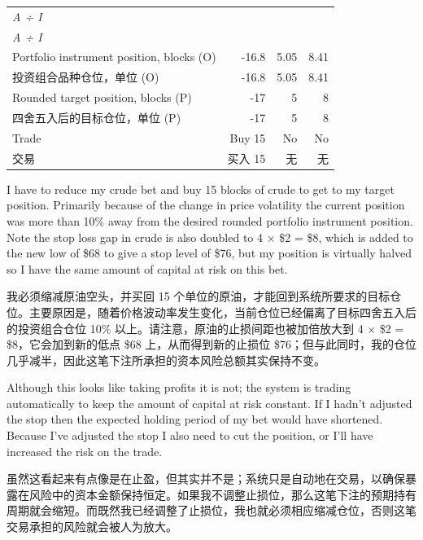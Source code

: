 \begin{bilingualtableblock}
{\begin{tabularx}{\textwidth}{@{} p{}*{3}{R}@{}}
\emph{A ÷ I} & & & \\
\emph{A ÷ I} & & & \\
Portfolio instrument position, blocks (O) & -16.8 & 5.05 & 8.41 \\
投资组合品种仓位，单位 (O) & -16.8 & 5.05 & 8.41 \\
Rounded target position, blocks (P) & -17 & 5 & 8 \\
四舍五入后的目标仓位，单位 (P) & -17 & 5 & 8 \\
Trade & Buy 15 & No & No \\
交易 & 买入 15 & 无 & 无 \\
\bottomrule
\end{tabularx}
}
\end{bilingualtableblock}

\begin{englishblock} I have to reduce my crude bet and buy 15 blocks of crude to get to my target position. Primarily because of the change in price volatility the current position was more than 10\% away from the desired rounded portfolio instrument position. Note the stop loss gap in crude is also doubled to 4 × \$2 = \$8, which is added to the new low of \$68 to give a stop level of \$76, but my position is virtually halved so I have the same amount of capital at risk on this bet. \end{englishblock}

\begin{chineseblock}我必须缩减原油空头，并买回 15 个单位的原油，才能回到系统所要求的目标仓位。主要原因是，随着价格波动率发生变化，当前仓位已经偏离了目标四舍五入后的投资组合仓位 10\% 以上。请注意，原油的止损间距也被加倍放大到 4 × \$2 = \$8，它会加到新的低点 \$68 上，从而得到新的止损位 \$76；但与此同时，我的仓位几乎减半，因此这笔下注所承担的资本风险总额其实保持不变。\end{chineseblock}

\bipairgap

\begin{englishblock} Although this looks like taking profits it is not; the system is trading automatically to keep the amount of capital at risk constant. If I hadn't adjusted the stop then the expected holding period of my bet would have shortened. Because I've adjusted the stop I also need to cut the position, or I'll have increased the risk on the trade. \end{englishblock}

\begin{chineseblock}虽然这看起来有点像是在止盈，但其实并不是；系统只是自动地在交易，以确保暴露在风险中的资本金额保持恒定。如果我不调整止损位，那么这笔下注的预期持有周期就会缩短。而既然我已经调整了止损位，我也就必须相应缩减仓位，否则这笔交易承担的风险就会被人为放大。\end{chineseblock}

